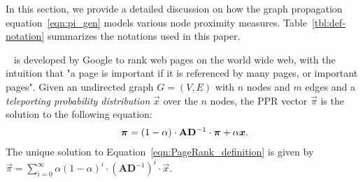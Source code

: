\begin{table} [t]
\begin{small}
\begin{tabular} {|l|p{2.3in}|}
		\end{tabular}
		\vspace{-3mm}
	\end{small}
\end{table}


In this section, we provide a detailed discussion on how the graph propagation equation~\eqref{eqn:pi_gen} models various node proximity measures. %
Table~\ref{tbl:def-notation} summarizes the notations used in this paper. 


~\cite{page1999pagerank} is  developed by Google to rank web pages on the world wide web, with the intuition that "a page is important if it is referenced by many pages, or important pages". Given an undirected graph $G=(V,E)$ with $n$ nodes and $m$ edges and a {\em teleporting probability distribution} $\vec{x}$ over the $n$ nodes, the PPR  vector $\vec{\pi}$ is the solution to the following equation:
\vspace{-1mm}
\begin{equation}\label{eqn:PageRank_definition}
	\begin{aligned}
	\vspace{-2mm}
		\vec{\pi}=\left( 1-\alpha \right) \cdot \mathbf{A}\mathbf{D}^{-1} \cdot \vec{\pi}+ \alpha\vec{x}.
	\end{aligned}
	\hspace{-2mm}
\end{equation}
The unique solution to Equation~\eqref{eqn:PageRank_definition} is given by $\vec{\pi}=\sum_{i=0}^\infty \alpha \left( 1-\alpha \right)^i \cdot \left(\mathbf{A} \mathbf{D}^{-1} \right)^i \cdot \vec{x}.$


